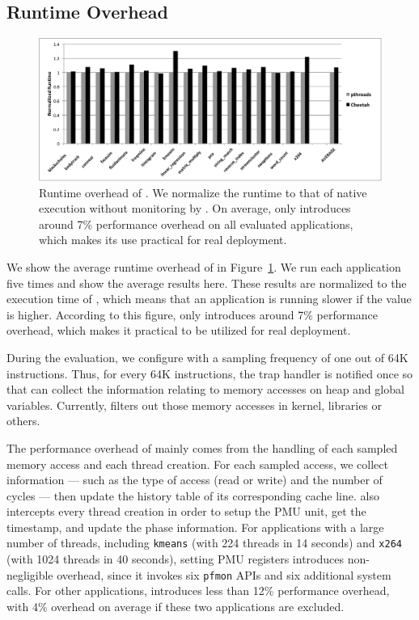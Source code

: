 \subsection{Runtime Overhead}
\label{sec:perf}

\begin{figure}[htbp]
\centering
\includegraphics[width=2\columnwidth]{figure/Overhead.pdf}
\caption{Runtime overhead of \Cheetah{}. We normalize the runtime to that of native execution without monitoring by \Cheetah{}. On average, \cheetah{} only introduces around 7\% performance overhead on all evaluated applications, which makes its use practical for real deployment. \label{fig:overhead}}
\end{figure}

We show the average runtime overhead of \cheetah{} in Figure~\ref{fig:overhead}. We run each application five times and show the average results here. These results are normalized to the execution time of \pthreads{}, which means that an application is running slower if the value is higher.  According to this figure, \cheetah{} only introduces around 7\% performance overhead, which makes it practical to be utilized for real deployment. 

During the evaluation, we configure \cheetah{} with a sampling frequency of one out of 64K instructions. Thus, for every 64K instructions, the trap handler is notified once so that \cheetah{} can collect the information relating to memory accesses on heap and global variables. Currently, \Cheetah{} filters out those memory accesses in kernel, libraries or others.

The performance overhead of \cheetah{} mainly comes from the handling of each sampled memory access and each thread creation. For each sampled access, we collect information --- such as the type of access (read or write) and the number of cycles --- then update the history table of its corresponding cache line. \cheetah{} also intercepts every thread creation in order to setup the PMU unit, get the timestamp, and update the phase information. For applications with a large number of threads, including \texttt{kmeans} (with 224 threads in 14 seconds) and \texttt{x264} (with 1024 threads in 40 seconds), setting PMU registers introduces non-negligible overhead, since it invokes six \texttt{pfmon} APIs and six additional system calls. For other applications, \cheetah{} introduces less than 12\% performance overhead, with 4\% overhead on average if these two applications are excluded.  

